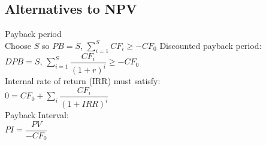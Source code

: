 \subsection*{Alternatives to NPV}
Payback period\\
Choose $S$ so $PB = S$, $\sum_{i=1}^S CF_i \geq - CF_0$ 
Discounted payback period: \\
$DPB = S$, $\sum_{i=1}^S \dfrac{CF_i}{(1+r)^i} \geq - CF_0$\\
Internal rate of return (IRR) must satisfy: \\
$0 = CF_0 +\sum_i\dfrac{CF_i}{(1+IRR)^i}$ \\
Payback Interval:\\
$PI = \dfrac{PV}{-CF_0}$
